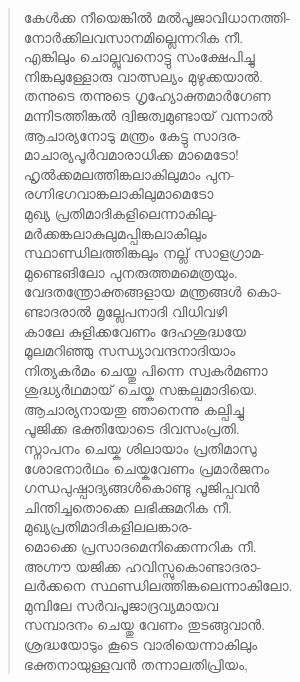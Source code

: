 \begin{verse}
കേള്‍ക്ക നീയെങ്കില്‍ മല്‍പൂജാവിധാനത്തി-\\
നോര്‍ക്കിലവസാനമില്ലെന്നറിക നീ.\\
എങ്കിലും ചൊല്ലുവനൊട്ടു സംക്ഷേപിച്ചു\\
നിങ്കലുള്ളോരു വാത്സല്യം മുഴുക്കയാല്‍.\\
തന്നുടെ തന്നുടെ ഗൃഹ്യോക്തമാര്‍ഗേണ\\
മന്നിടത്തിങ്കല്‍ ദ്വിജത്വമുണ്ടായ് വന്നാല്‍\\
ആചാര്യനോടു മന്ത്രം കേട്ടു സാദര-\\
മാചാര്യപൂര്‍വമാരാധിക്ക മാമെടോ!\\
ഹൃല്‍ക്കമലത്തിങ്കലാകിലുമാം പുന-\\
രഗ്നിഭഗവാങ്കലാകിലുമാമെടോ\\
മുഖ്യ പ്രതിമാദികളിലെന്നാകിലു-\\
മര്‍ക്കങ്കലാകുലുമപ്പിങ്കലാകിലും\\
സ്ഥാണ്ഡിലത്തിങ്കലും നല്ല് സാളഗ്രാമ-\\
മുണ്ടെങിലോ പുനരുത്തമമെത്രയും.\\
വേദതന്ത്രോക്തങ്ങളായ മന്ത്രങ്ങള്‍ കൊ-\\
ണ്ടാദരാല്‍ മൃല്ലേപനാദി വിധിവഴി\\
കാലേ കുളിക്കവേണം ദേഹശുദ്ധയേ\\
മൂലമറിഞ്ഞു സന്ധ്യാവന്ദനാദിയാം\\
നിത്യകര്‍മം ചെയ്തു പിന്നെ സ്വകര്‍മണാ\\
ശുദ്ധ്യര്‍ഥമായ് ചെയ്ക സങ്കല്പമാദിയെ.\\
ആചാര്യനായതു ഞാനെന്നു കല്പിച്ചു\\
പൂജിക്ക ഭക്തിയോടെ ദിവസംപ്രതി.\\
സ്നാപനം ചെയ്ക ശിലായാം പ്രതിമാസു\\
ശോഭനാര്‍ഥം ചെയ്കവേണം പ്രമാര്‍ജനം\\
ഗന്ധപുഷ്പാദ്യങ്ങള്‍കൊണ്ടു പൂജിപ്പവന്‍\\
ചിന്തിച്ചതൊക്കെ ലഭിക്കുമറിക നീ.\\
മുഖ്യപ്രതിമാദികളിലലങ്കാര-\\
മൊക്കെ പ്രസാദമെനിക്കെന്നറിക നീ.\\
അഗ്നൗ യജിക്ക ഹവിസ്സുകൊണ്ടാദരാ-\\
ലര്‍ക്കനെ സ്ഥണ്ഡിലത്തിങ്കലെന്നാകിലോ.\\
മുമ്പിലേ സര്‍വപൂജാദ്രവ്യമായവ\\
സമ്പാദനം ചെയ്തു വേണം തുടങ്ങുവാന്‍.\\
ശ്രദ്ധയോടും കൂടെ വാരിയെന്നാകിലും\\
ഭക്തനായുള്ളവന്‍ തന്നാലതിപ്രിയം,\\

\end{verse}
